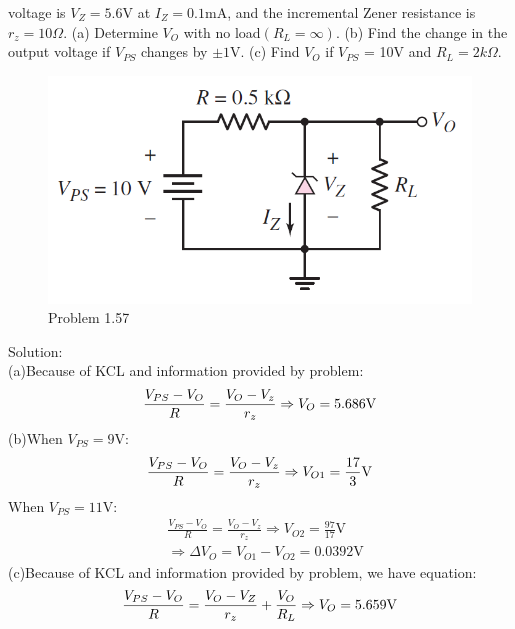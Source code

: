 \documentclass[a4paper,11pt,UTF8]{article}
\begin{document}
voltage is $V_Z = 5.6$V at $I_Z = 0.1$mA, and the incremental Zener resistance
is $r_z = 10\Omega$. (a) Determine $V_O$ with no load$ (R_L =\infty)$. (b) Find
the change in the output voltage if $V_{PS}$ changes by $\pm1$V. (c) Find $V_O$ if
$V_{PS}$ = 10V and $R_L = 2k\Omega$.\\
\begin{figure}[H] 
	\centering 
	\includegraphics[scale=0.35]{MD1_57.png}
	\caption{Problem 1.57}
\end{figure}
\noindent Solution:\\
(a)Because of KCL and information provided by problem:
$$
	\frac{V_{PS}-V_O}{R}=\frac{V_O-V_z}{r_z}\\
	\Rightarrow V_{O}=5.686\text{V}
$$
(b)When $V_{PS}=9$V:
$$
\frac{V_{PS}-V_O}{R}=\frac{V_O-V_z}{r_z}\\
\Rightarrow V_{O1}=\frac{17}{3}\text{V}
$$
When $V_{PS}=11$V:
$$\begin{aligned}
	&\frac{V_{PS}-V_O}{R}=\frac{V_O-V_z}{r_z}
	\Rightarrow V_{O2}=\frac{97}{17}\text{V}\\
	&\Rightarrow \Delta V_{O}=V_{O1}-V_{O2}=0.0392\text{V}
\end{aligned}	
$$
(c)Because of KCL and information provided by problem, we have equation:
$$
	\frac{V_{PS}-V_O}{R}=\frac{V_O-V_Z}{r_z}+\frac{V_O}{R_L}\\
	\Rightarrow V_O = 5.659 \text{V}
$$
\end{document}
